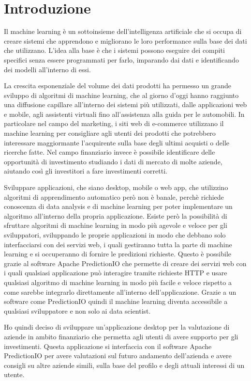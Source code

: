 \chapter{Introduzione}\label{c:introduzione}

Il machine learning è un sottoinsieme dell'intelligenza artificiale che si occupa di creare sistemi che apprendono e migliorano le loro performance sulla base dei dati che utilizzano. L'idea alla base è che i sistemi possono eseguire dei compiti specifici senza essere programmati per farlo,  imparando dai dati e identificando dei modelli all'interno di essi.

La crescita esponenziale del volume dei dati prodotti ha permesso un grande sviluppo di algoritmi di machine learning,  che al giorno d'oggi hanno raggiunto una diffusione capillare all'interno dei sistemi più utilizzati,  dalle applicazioni web e mobile,  agli assistenti virtuali fino all'assistenza alla guida per le automobili.  In particolare nel campo del marketing,  i siti web di e-commerce utilizzano il machine learning per consigliare agli utenti dei prodotti che potrebbero interessare maggiormante l'acquirente sulla base degli ultimi acquisti o delle ricerche fatte. Nel campo finanziario invece è possibile identificare delle opportunità di investimento studiando i dati di mercato di molte aziende, aiutando così gli investitori a fare investimenti corretti.

Sviluppare applicazioni, che siano desktop, mobile o web app, che utilizzino algoritmi di apprendimento automatico però non è banale, perchè richiede conoscenza di data analysis e di machine learning per poter implementare un algoritmo all'interno della propria applicazione. Esiste però la possibilità di sfruttare algoritmi di machine learning in modo più agevole e veloce per gli sviluppatori, sviluppando le proprie applicazioni in modo che debbano solo interfacciarsi con dei servizi web, i quali gestiranno tutta la parte di machine learning e si occuperanno di fornire le predizioni richieste. Questo è possibile grazie al software Apache PredictionIO che permette di creare dei servizi web con i quali qualsiasi applicazione può interagire tramite richieste HTTP e usare qualsiasi algoritmo di machine learning in modo più facile e veloce rispetto a come sarebbe integrarlo direttamente all'interno dell'applicazione. Grazie a un software come PredictionIO quindi il machine learning diventa accessibile a qualsiasi sviluppatore e non solo ai data scientist.

Ho quindi deciso di sviluppare un'applicazione desktop per la valutazione di aziende in ambito finanziario che permetta agli utenti di avere supporto per gli investimenti. Questa applicazione si interfaccia con il software Apache PredictionIO per avere valutazioni sul futuro andamento dell'azienda e avere consigli su altre aziende simili, sulla base del profilo  e degli attuali interessi di un utente.

